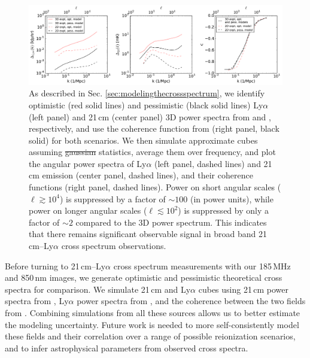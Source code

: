 \documentclass[numberedappendix]{emulateapj}
\providecommand{\DIFadd}[1]{{\protect\color{blue}\uwave{#1}}} %
\providecommand{\DIFdel}[1]{{\protect\color{red}\sout{#1}}}                      %
\providecommand{\DIFaddFL}[1]{\DIFadd{#1}} %
\providecommand{\DIFdelFL}[1]{\DIFdel{#1}} %
\providecommand{\DIFaddbeginFL}{} %
\providecommand{\DIFaddendFL}{} %
\providecommand{\DIFdelbeginFL}{} %
\providecommand{\DIFdelendFL}{} %
\begin{document}
\begin{figure}[h]
\centering
\includegraphics[width=7in]{spectra3D_to_2D.pdf}
\caption[Study of the relationship between power spectra recovered from 2D and 3D surveys, both for 21\,cm and 850\,nm cubes.]{As described in Sec. \ref{sec:modelingthecrossspectrum}, we identify optimistic (red solid lines) and pessimistic (black solid lines) Ly$\alpha$ (left panel) and 21\,cm (center panel) 3D power spectra from \citet{Gong2014} and \DIFdelbeginFL %
\DIFdelendFL \DIFaddbeginFL \citet{PoberNextGen, 21cmfast}\DIFaddendFL , respectively, and use the coherence function from \citet{Heneka2016} (right panel, black solid) for both scenarios. We then simulate approximate cubes assuming \DIFdelbeginFL \DIFdelFL{gaussian }\DIFdelendFL \DIFaddbeginFL \DIFaddFL{Gaussian }\DIFaddendFL statistics, average them over frequency, and plot the angular power spectra of Ly$\alpha$ (left panel, dashed lines) and 21\,cm emission (center panel, dashed lines), and their coherence functions (right panel, dashed lines). Power on short angular scales ($\ell\gtrsim10^4$) is suppressed by a factor of $\sim100$ (in power units), while power on longer angular scales ($\ell\lesssim10^2$) is suppressed by only a factor of $\sim2$ compared to the 3D power spectrum. This indicates that there remains significant observable signal in broad band 21\,cm--Ly$\alpha$ cross spectrum observations. }
\label{fig:spectra3Dto2D}
\end{figure}

Before turning to 21\,cm--Ly$\alpha$ cross spectrum measurements with our 185\,MHz and 850\,nm images, we generate optimistic and pessimistic theoretical cross spectra for comparison. We simulate 21\,cm and Ly$\alpha$ cubes using 21\,cm power spectra from \citet{PoberNextGen}, Ly$\alpha$ power spectra from \citet{Gong2014}, and the coherence between the two fields from \citet{Heneka2016}. Combining simulations from all these sources allows us to better estimate the modeling uncertainty. Future work is needed to more self-consistently model these fields and their correlation over a range of possible reionization scenarios, and to infer astrophysical parameters from observed cross spectra.
\end{document}
